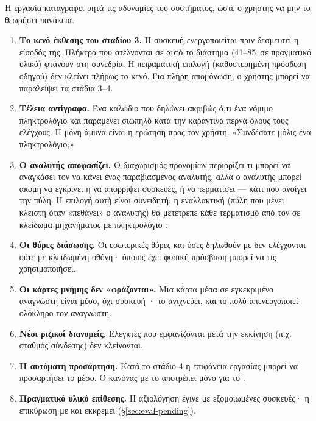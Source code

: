 Η εργασία καταγράφει ρητά τις αδυναμίες του συστήματος, ώστε ο χρήστης να μην
το θεωρήσει πανάκεια.

\begin{enumerate}
  \item \textbf{Το κενό έκθεσης του σταδίου 3.} Η συσκευή ενεργοποιείται πριν
        δεσμευτεί η είσοδός της. Πλήκτρα που στέλνονται σε αυτό το διάστημα
        (41–85\, σε πραγματικό υλικό) φτάνουν στη συνεδρία. Η πειραματική
        επιλογή  (καθυστερημένη πρόσδεση οδηγού) δεν
        κλείνει πλήρως το κενό. Για πλήρη απομόνωση, ο χρήστης μπορεί να
        παραλείψει τα στάδια 3–4.
  \item \textbf{Τέλεια αντίγραφα.} Ένα καλώδιο  που δηλώνει ακριβώς ό,τι
        ένα νόμιμο πληκτρολόγιο και παραμένει σιωπηλό κατά την καραντίνα
        περνά όλους τους ελέγχους. Η μόνη άμυνα είναι η ερώτηση προς τον
        χρήστη: «Συνδέσατε μόλις ένα πληκτρολόγιο;»
  \item \textbf{Ο αναλυτής αποφασίζει.} Ο διαχωρισμός προνομίων περιορίζει τι
        μπορεί να αναγκάσει τον  να κάνει ένας παραβιασμένος αναλυτής,
        αλλά ο αναλυτής μπορεί ακόμη να εγκρίνει ή να απορρίψει συσκευές, ή να
        τερματίσει — κάτι που ανοίγει την πύλη. Η επιλογή αυτή είναι
        συνειδητή: η εναλλακτική (πύλη που μένει κλειστή όταν «πεθάνει» ο
        αναλυτής) θα μετέτρεπε κάθε τερματισμό από τον  σε
        κλείδωμα μηχανήματος με πληκτρολόγιο .
  \item \textbf{Οι θύρες διάσωσης.} Οι εσωτερικές θύρες και όσες δηλωθούν με
         δεν ελέγχονται ούτε με κλειδωμένη οθόνη· όποιος
        έχει φυσική πρόσβαση μπορεί να τις χρησιμοποιήσει.
  \item \textbf{Οι κάρτες μνήμης δεν «φράζονται».} Μια κάρτα μέσα σε εγκεκριμένο
        αναγνώστη είναι μέσο, όχι συσκευή · το 
        ανιχνεύει, και το πολύ απενεργοποιεί ολόκληρο τον αναγνώστη.
  \item \textbf{Νέοι ριζικοί διανομείς.} Ελεγκτές που εμφανίζονται μετά την
        εκκίνηση (π.χ. σταθμός σύνδεσης) δεν κλείνονται.
  \item \textbf{Η αυτόματη προσάρτηση.} Κατά το στάδιο 4 η επιφάνεια εργασίας
        μπορεί να προσαρτήσει το μέσο. Ο κανόνας  με
         το αποτρέπει μόνο για το .
  \item \textbf{Πραγματικό υλικό επίθεσης.} Η αξιολόγηση έγινε με εξομοιωμένες
        συσκευές· η επικύρωση με  και  εκκρεμεί
        (§\ref{sec:eval-pending}).
\end{enumerate}

